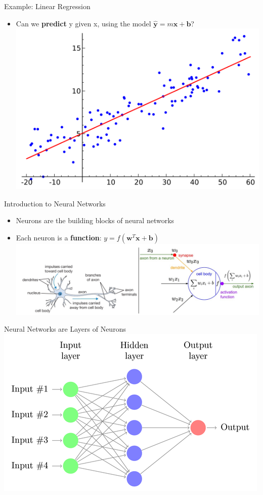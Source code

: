 \documentclass{beamer}
\begin{document}
\begin{frame}{Example: Linear Regression}
\begin{itemize}
    \item Can we \textbf{predict} y given x, using the model $\hat{\textbf{y}}=m\textbf{x}+\textbf{b}$?
    \includegraphics[scale=0.2]{LinReg.png}

\end{itemize}

\end{frame}

\begin{frame}{Introduction to Neural Networks}
\begin{itemize}
    \item Neurons are the building blocks of neural networks
    \item Each neuron is a \textbf{function}: $y=f(\textbf{w}^{T}\textbf{x}+\textbf{b})$
    \includegraphics[scale=0.4]{Neuron.png}
\end{itemize}
\end{frame}

\begin{frame}{Neural Networks are Layers of Neurons}
    \includegraphics[scale=0.6]{neural-network.png}
\end{frame}
\end{document}
